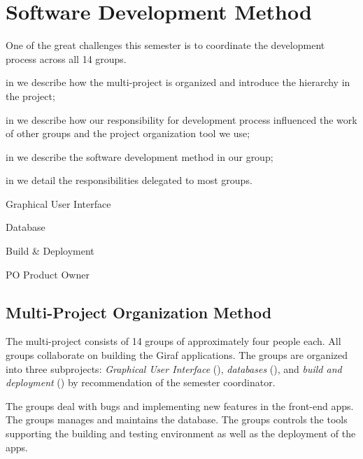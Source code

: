 \chapter{Software Development Method}\label{chap:sw_dev_method}
One of the great challenges this semester is to coordinate the development process across all 14 groups. 

\begin{chapterorganization}
  \item in  we describe how the multi-project is organized and introduce the hierarchy in the project;
  \item in  we describe how our responsibility for development process influenced the work of other groups and the project organization tool we use;
  \item in  we describe the software development method in our group;
  \item in  we detail the responsibilities delegated to most groups.
\end{chapterorganization}

\begin{abbreviations}
  \item[\gui] Graphical User Interface
  \item[\db] Database
  \item[\bd] Build \& Deployment
  \item[PO] Product Owner
\end{abbreviations}

\section{Multi-Project Organization Method}\label{sec:project_overview}
The multi-project consists of 14 groups of approximately four people each. All groups collaborate on building the Giraf applications. The groups are organized into three subprojects: \emph{Graphical User Interface} (\gui), \emph{databases} (\db), and \emph{build and deployment} (\bd) by recommendation of the semester coordinator.

The \gui groups deal with bugs and implementing new features in the front-end apps. The \db groups manages and maintains the database. The \bd groups controls the tools supporting the building and testing environment as well as the deployment of the apps.

